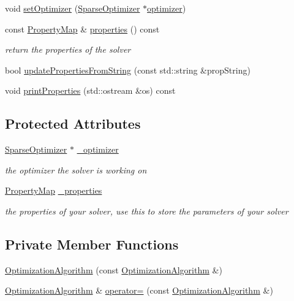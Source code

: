 \begin{DoxyCompactItemize}
void \hyperlink{classg2o_1_1OptimizationAlgorithm_aff88a3dc8357c98712ff0047e601bd5e}{set\+Optimizer} (\hyperlink{classg2o_1_1SparseOptimizer}{Sparse\+Optimizer} $\ast$\hyperlink{classg2o_1_1OptimizationAlgorithm_ae1799d6aed633e94574072d26ed4cb4e}{optimizer})
\item 
const \hyperlink{classg2o_1_1PropertyMap}{Property\+Map} \& \hyperlink{classg2o_1_1OptimizationAlgorithm_a1e03513e64271df6420ca71bc7524e67}{properties} () const 
\begin{DoxyCompactList}\small\item\em return the properties of the solver \end{DoxyCompactList}\item 
bool \hyperlink{classg2o_1_1OptimizationAlgorithm_aa05a6380f936c728a574c7c272bcc524}{update\+Properties\+From\+String} (const std\+::string \&prop\+String)
\item 
void \hyperlink{classg2o_1_1OptimizationAlgorithm_ad07be53fd879acfb919ca7d3ef73e97b}{print\+Properties} (std\+::ostream \&os) const 
\end{DoxyCompactItemize}
\subsection*{Protected Attributes}
\begin{DoxyCompactItemize}
\item 
\hyperlink{classg2o_1_1SparseOptimizer}{Sparse\+Optimizer} $\ast$ \hyperlink{classg2o_1_1OptimizationAlgorithm_a6017c344be0d9f09d6674849849c6b60}{\+\_\+optimizer}
\begin{DoxyCompactList}\small\item\em the optimizer the solver is working on \end{DoxyCompactList}\item 
\hyperlink{classg2o_1_1PropertyMap}{Property\+Map} \hyperlink{classg2o_1_1OptimizationAlgorithm_ae37b494f69b483a3fcafa944e987e325}{\+\_\+properties}
\begin{DoxyCompactList}\small\item\em the properties of your solver, use this to store the parameters of your solver \end{DoxyCompactList}\end{DoxyCompactItemize}
\subsection*{Private Member Functions}
\begin{DoxyCompactItemize}
\item 
\hyperlink{classg2o_1_1OptimizationAlgorithm_af4bf8ed80e63df3f1a066e8b0098eb27}{Optimization\+Algorithm} (const \hyperlink{classg2o_1_1OptimizationAlgorithm}{Optimization\+Algorithm} \&)
\item 
\hyperlink{classg2o_1_1OptimizationAlgorithm}{Optimization\+Algorithm} \& \hyperlink{classg2o_1_1OptimizationAlgorithm_a74d342220fa0b1588e21f61959ff414a}{operator=} (const \hyperlink{classg2o_1_1OptimizationAlgorithm}{Optimization\+Algorithm} \&)
\end{DoxyCompactItemize}


